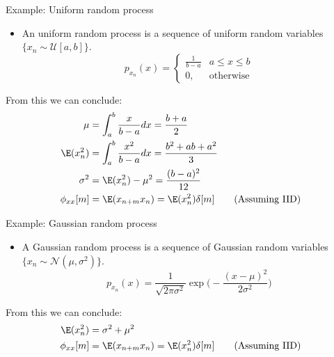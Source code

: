 \documentclass[10pt, aspectratio=169]{beamer}
\begin{document}
\begin{frame}{Example: Uniform random process}
	
	\begin{itemize}
		\item An uniform random process is a sequence of uniform random variables $\{x_n \sim \mathcal{U}[a, b]\}$.
		\begin{equation*}
		p_{x_n}(x) = \begin{cases}
		\displaystyle\frac{1}{b-a} & a\leq x\leq b \\
		0, &\text{otherwise}
		\end{cases}
		\end{equation*}
	\end{itemize}
	From this we can conclude:
	\begin{align*} 
	\mu &= \int_{a}^{b} \frac{x}{b-a}dx = \frac{b+a}{2} \\
	\E(x_n^2) &= \int_{a}^{b} \frac{x^2}{b-a}dx = \frac{b^2+ab+a^2}{3} \\
	\sigma^2 &= \E(x_n^2) - \mu^2 = \frac{(b-a)^2}{12} \\
	\phi_{xx}[m] &=\E(x_{n+m}x_n) = \E(x_n^2)\delta[m] \tag{Assuming IID}
	\end{align*}
\end{frame}

\begin{frame}{Example: Gaussian random process}
	
	\begin{itemize}
		\item A Gaussian random process is a sequence of Gaussian random variables $\{x_n \sim \mathcal{N}(\mu, \sigma^2)\}$.
		\begin{equation*}
		p_{x_n}(x) = \frac{1}{\sqrt{2\pi\sigma^2}}\exp\bigg(-\frac{(x-\mu)^2}{2\sigma^2}\bigg)
		\end{equation*}

	\end{itemize}
	From this we can conclude:
	\begin{align*} 
	\E(x_n^2) &= \sigma^2 + \mu^2 \\
	\phi_{xx}[m] &=\E(x_{n+m}x_n) = \E(x_n^2)\delta[m] \tag{Assuming IID}
	\end{align*}	
\end{frame}

\end{document}
